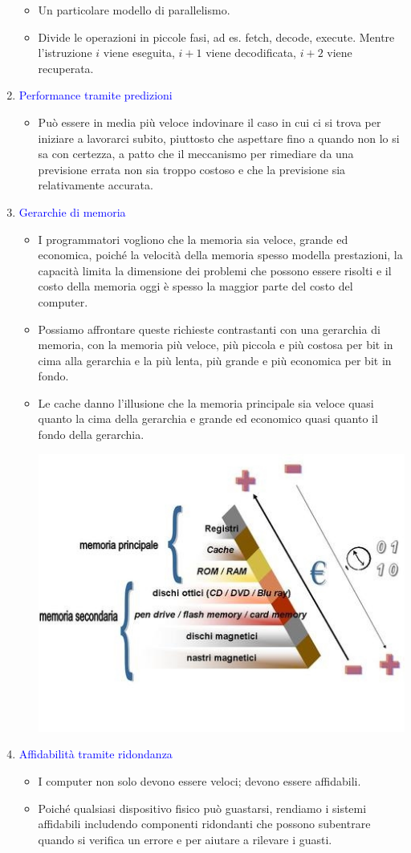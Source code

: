 \documentclass[12pt,a4paper]{article}
\begin{document}
\begin{enumerate}
\begin{itemize}
\item Un particolare modello di parallelismo.
\item Divide le operazioni in piccole fasi, ad es. fetch, decode, execute. Mentre l'istruzione $i$ viene eseguita, $i+1$
viene decodificata, $i+2$ viene recuperata.
\end{itemize}
\item \textcolor{blue}{Performance tramite predizioni}
\begin{itemize}
\item Può essere in media più veloce indovinare il caso in cui ci si trova per iniziare a lavorarci subito, piuttosto che aspettare fino a quando non lo si sa con certezza, a patto che il meccanismo per rimediare da una previsione errata non sia troppo costoso e che la previsione sia relativamente accurata.
\end{itemize}
\item \textcolor{blue}{Gerarchie di memoria}
\begin{itemize}
\item I programmatori vogliono che la memoria sia veloce, grande ed economica, poiché la velocità della memoria spesso modella prestazioni, la capacità limita la dimensione dei problemi che possono essere risolti e il costo della memoria oggi è spesso la maggior parte del costo del computer.
\item Possiamo affrontare queste richieste contrastanti con una gerarchia di memoria, con la memoria più veloce, più piccola e più costosa per bit in cima alla gerarchia e la più lenta, più grande e più economica per bit in fondo.
\item Le cache danno l'illusione che la memoria principale sia veloce quasi quanto la cima della gerarchia e grande ed economico quasi quanto il fondo della gerarchia.
\begin{center}
\includegraphics[width=0.6\columnwidth]{img/piramide_memorie.jpeg}
\end{center}
\end{itemize}
\item \textcolor{blue}{Affidabilità tramite ridondanza}
\begin{itemize}
\item I computer non solo devono essere veloci; devono essere affidabili.
\item Poiché qualsiasi dispositivo fisico può guastarsi, rendiamo i sistemi affidabili includendo componenti ridondanti che possono subentrare quando si verifica un errore e per aiutare a rilevare i guasti.
\end{itemize}
\end{enumerate}
\end{document}
